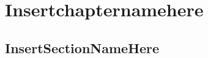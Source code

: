 \chapter{Insertchapternamehere}
\label{cha:chapter1}

\section{InsertSectionNameHere}
\label{sec:chapter1:section1}

